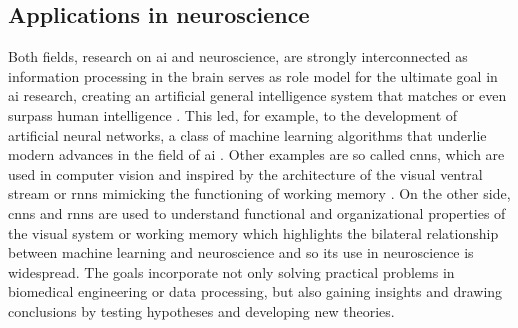 \subsection{Applications in neuroscience}
Both fields, research on \gls{ai} and neuroscience, are strongly interconnected as information processing in the brain serves as role model for the ultimate goal in \gls{ai} research, creating an artificial general intelligence system that matches or even surpass human intelligence \cite{Macpherson2021}. This led, for example, to the development of artificial neural networks, a class of machine learning algorithms that underlie modern advances in the field of \gls{ai} \cite{Cox2014}. Other examples are so called \glspl{cnn}, which are used in computer vision and inspired by the architecture of the visual ventral stream or \glspl{rnn} mimicking the functioning of working memory \cite{Macpherson2021, Fukushima1982, Yin2020}. On the other side, \glspl{cnn} and \glspl{rnn} are used to understand functional and organizational properties of the visual system \cite{Yamins2014} or working memory \cite{Kim2021} which highlights the bilateral relationship between machine learning and neuroscience and so its use in neuroscience is widespread. The goals incorporate not only solving practical problems in biomedical engineering or data processing, but also gaining insights and drawing conclusions by testing hypotheses and developing new theories.\\
